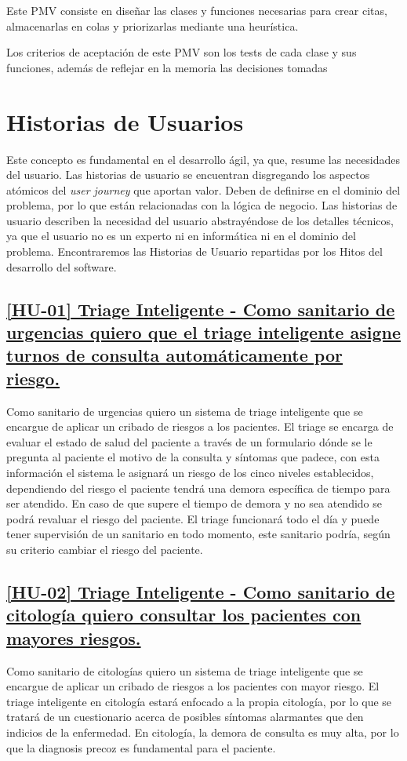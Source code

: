 Este PMV consiste en diseñar las clases y funciones necesarias para crear citas, almacenarlas en colas y priorizarlas mediante una heurística.

Los criterios de aceptación de este PMV son los tests de cada clase y sus funciones, además de reflejar en la memoria las decisiones tomadas

\section{Historias de Usuarios}
Este concepto es fundamental en el desarrollo ágil, ya que, resume las necesidades del usuario.
Las historias de usuario se encuentran disgregando los aspectos atómicos del \textit{user journey} que aportan valor.
Deben de definirse en el dominio del problema, por lo que están relacionadas con la lógica de negocio.
Las historias de usuario describen la necesidad del usuario abstrayéndose de los detalles técnicos, ya que
el usuario no es un experto ni en informática ni en el dominio del problema.
Encontraremos las Historias de Usuario repartidas por los Hitos del desarrollo del software.


\subsection*{\href{https://github.com/RubenDelgadoPareja/TFG-Triage-Inteligente-Consulta-Medica/issues/19}{[HU-01] Triage Inteligente - Como sanitario de urgencias quiero que el triage inteligente asigne turnos de consulta automáticamente por riesgo.}}
Como sanitario de urgencias quiero un sistema de triage inteligente que se encargue de aplicar un cribado de riesgos a los pacientes.
El triage se encarga de evaluar el estado de salud del paciente a través de un formulario dónde se le pregunta al paciente el motivo de la consulta y
síntomas que padece, con esta información el sistema le asignará un riesgo de los cinco niveles establecidos, dependiendo del riesgo el paciente tendrá una demora
específica de tiempo para ser atendido. En caso de que supere el tiempo de demora y no sea atendido se podrá revaluar el riesgo del paciente.
El triage funcionará todo el día y puede tener supervisión de un sanitario en todo momento, este sanitario podría, según su criterio cambiar el riesgo del paciente.

\subsection*{\href{https://github.com/RubenDelgadoPareja/TFG-Triage-Inteligente-Consulta-Medica/issues/101}{[HU-02] Triage Inteligente - Como sanitario de citología quiero consultar los pacientes con mayores riesgos.}}
Como sanitario de citologías quiero un sistema de triage inteligente que se encargue de aplicar un cribado de riesgos a los pacientes con mayor riesgo.
El triage inteligente en citología estará enfocado a la propia citología, por lo que se tratará de un cuestionario acerca de posibles síntomas alarmantes
que den indicios de la enfermedad. En citología, la demora de consulta es muy alta, por lo que la diagnosis precoz es fundamental para el paciente.

